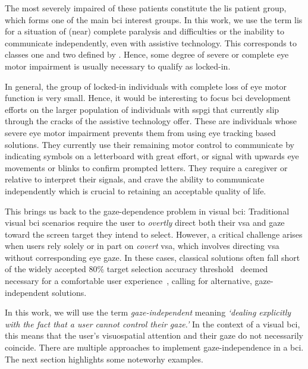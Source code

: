 The most severely impaired of these patients constitute the \ac{lis}
patient group, which forms one of the main \ac{bci} interest groups.
In this work, we use the term \ac{lis} for a situation of (near)
complete paralysis and difficulties or the inability to communicate independently,
even with assistive technology.
This corresponds to classes one and two defined by
\textcite{Wolpaw2006}\fnwolpawcrit.
Hence, some degree of severe or complete eye motor impairment is usually
necessary to qualify as locked-in\fnlis.

In general, the group of locked-in individuals with complete loss of eye motor
function is very small.
Hence, it would be interesting to focus \ac{bci} development efforts on the
larger population of individuals with \ac{sspgi}  that currently slip through
the cracks of the assistive technology offer.
These are individuals whose severe eye motor impairment prevents them from
using eye tracking based solutions.
They currently use their remaining motor control to
communicate by indicating symbols on a letterboard with great effort,
or signal with upwards eye movements or blinks to confirm prompted letters.
They require a caregiver or relative to interpret their signals, and crave
the ability to communicate independently which is crucial to retaining an
acceptable quality of life.

This brings us back to the gaze-dependence problem in visual \ac{bci}:
Traditional visual \ac{bci} scenarios require the user to \emph{overtly} direct both their
\ac{vsa} and gaze toward the screen target they intend to select.
However, a critical challenge arises when users rely solely or in part on
\emph{covert} \ac{vsa}, which involves directing \ac{vsa} without corresponding
eye gaze.
In these cases, classical solutions often fall short of the widely accepted
80\% target selection accuracy threshold~\cite{Brunner2010,Frenzel2011,Treder2010,RonAngevin2019}
deemed necessary for a comfortable user experience~\cite{Neeling2019}, calling for alternative, gaze-independent
solutions.

In this work, we will use the term \emph{gaze-independent} meaning
\emph{‘dealing explicitly with the fact that a user cannot control their
gaze.'}
In the context of a visual \ac{bci}, this means that the user's
visuospatial attention and their gaze do not necessarily coincide.
There are multiple approaches to implement gaze-independence in a \ac{bci}.
The next section highlights some noteworhy examples.

